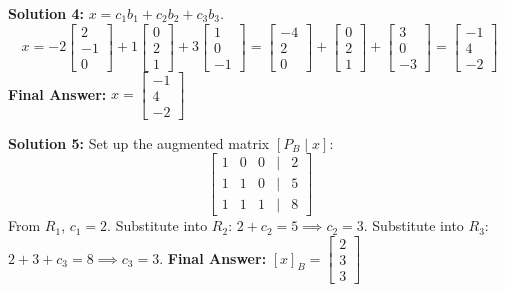\documentclass{article}
\begin{document}
\vspace{0.3cm}
\textbf{Solution 4:} $x = c_1b_1 + c_2b_2 + c_3b_3$.
\[ x = -2 \begin{bmatrix} 2 \\ -1 \\ 0 \end{bmatrix} + 1 \begin{bmatrix} 0 \\ 2 \\ 1 \end{bmatrix} + 3 \begin{bmatrix} 1 \\ 0 \\ -1 \end{bmatrix} = \begin{bmatrix} -4 \\ 2 \\ 0 \end{bmatrix} + \begin{bmatrix} 0 \\ 2 \\ 1 \end{bmatrix} + \begin{bmatrix} 3 \\ 0 \\ -3 \end{bmatrix} = \begin{bmatrix} -1 \\ 4 \\ -2 \end{bmatrix} \]
\textbf{Final Answer:} $x = \begin{bmatrix} -1 \\ 4 \\ -2 \end{bmatrix}$

\vspace{0.3cm}
\textbf{Solution 5:} Set up the augmented matrix $[P_B \mid x]$:
\[ \begin{bmatrix} 1 & 0 & 0 & \big| & 2 \\ 1 & 1 & 0 & \big| & 5 \\ 1 & 1 & 1 & \big| & 8 \end{bmatrix} \]
From $R_1$, $c_1 = 2$. Substitute into $R_2$: $2 + c_2 = 5 \implies c_2 = 3$. Substitute into $R_3$: $2 + 3 + c_3 = 8 \implies c_3 = 3$.
\textbf{Final Answer:} $[x]_B = \begin{bmatrix} 2 \\ 3 \\ 3 \end{bmatrix}$
\end{document}
